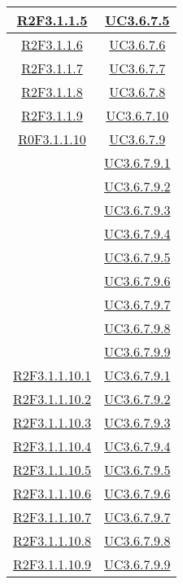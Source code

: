 \begin{longtable}{|c|c|}
\hline
\hyperlink{R2F3.1.1.5}{R2F3.1.1.5} & \hyperlink{UC3.6.7.5}{UC3.6.7.5}\\
\hline
\hyperlink{R2F3.1.1.6}{R2F3.1.1.6} & \hyperlink{UC3.6.7.6}{UC3.6.7.6}\\
\hline
\hyperlink{R2F3.1.1.7}{R2F3.1.1.7} & \hyperlink{UC3.6.7.7}{UC3.6.7.7}\\
\hline
\hyperlink{R2F3.1.1.8}{R2F3.1.1.8} & \hyperlink{UC3.6.7.8}{UC3.6.7.8}\\
\hline
\hyperlink{R2F3.1.1.9}{R2F3.1.1.9} & \hyperlink{UC3.6.7.10}{UC3.6.7.10}\\
\hline
\hyperlink{R0F3.1.1.10}{R0F3.1.1.10} & \hyperlink{UC3.6.7.9}{UC3.6.7.9}\\
& \hyperlink{UC3.6.7.9.1}{UC3.6.7.9.1}\\
& \hyperlink{UC3.6.7.9.2}{UC3.6.7.9.2}\\
& \hyperlink{UC3.6.7.9.3}{UC3.6.7.9.3}\\
& \hyperlink{UC3.6.7.9.4}{UC3.6.7.9.4}\\
& \hyperlink{UC3.6.7.9.5}{UC3.6.7.9.5}\\
& \hyperlink{UC3.6.7.9.6}{UC3.6.7.9.6}\\
& \hyperlink{UC3.6.7.9.7}{UC3.6.7.9.7}\\
& \hyperlink{UC3.6.7.9.8}{UC3.6.7.9.8}\\
& \hyperlink{UC3.6.7.9.9}{UC3.6.7.9.9}\\
\hline
\hyperlink{R2F3.1.1.10.1}{R2F3.1.1.10.1} & \hyperlink{UC3.6.7.9.1}{UC3.6.7.9.1}\\
\hline
\hyperlink{R2F3.1.1.10.2}{R2F3.1.1.10.2} & \hyperlink{UC3.6.7.9.2}{UC3.6.7.9.2}\\
\hline
\hyperlink{R2F3.1.1.10.3}{R2F3.1.1.10.3} & \hyperlink{UC3.6.7.9.3}{UC3.6.7.9.3}\\
\hline
\hyperlink{R2F3.1.1.10.4}{R2F3.1.1.10.4} & \hyperlink{UC3.6.7.9.4}{UC3.6.7.9.4}\\
\hline
\hyperlink{R2F3.1.1.10.5}{R2F3.1.1.10.5} & \hyperlink{UC3.6.7.9.5}{UC3.6.7.9.5}\\
\hline
\hyperlink{R2F3.1.1.10.6}{R2F3.1.1.10.6} & \hyperlink{UC3.6.7.9.6}{UC3.6.7.9.6}\\
\hline
\hyperlink{R2F3.1.1.10.7}{R2F3.1.1.10.7} & \hyperlink{UC3.6.7.9.7}{UC3.6.7.9.7}\\
\hline
\hyperlink{R2F3.1.1.10.8}{R2F3.1.1.10.8} & \hyperlink{UC3.6.7.9.8}{UC3.6.7.9.8}\\
\hline
\hyperlink{R2F3.1.1.10.9}{R2F3.1.1.10.9} & \hyperlink{UC3.6.7.9.9}{UC3.6.7.9.9}\\

\end{longtable}
